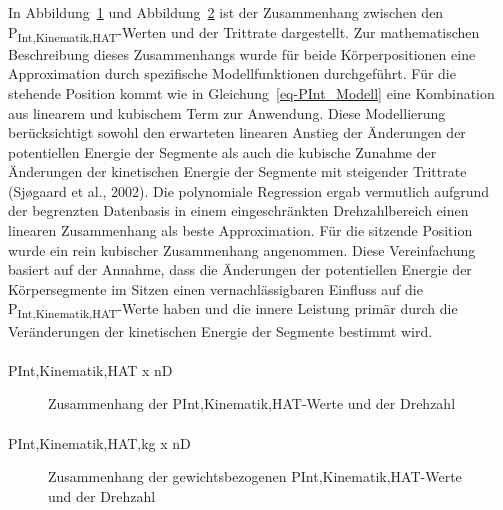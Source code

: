 \documentclass[
  letterpaper,
  DIV=11]{scrartcl}
\makeatletter
\let\oldparagraph\paragraph
\renewcommand{\paragraph}{
    \@ifstar
      \xxxParagraphStar
      \xxxParagraphNoStar
  }
\newcommand{\xxxParagraphStar}[1]{\oldparagraph*{#1}\mbox{}}
\newcommand{\xxxParagraphNoStar}[1]{\oldparagraph{#1}\mbox{}}
\makeatother
\begin{document}
In Abbildung~\ref{fig-PInt_Kinematik_HAT_Drehzahl} und
Abbildung~\ref{fig-PInt_Kinematik_HAT_Drehzahl_kg} ist der Zusammenhang
zwischen den P\textsubscript{Int,Kinematik,HAT}-Werten und der Trittrate
dargestellt. Zur mathematischen Beschreibung dieses Zusammenhangs wurde
für beide Körperpositionen eine Approximation durch spezifische
Modellfunktionen durchgeführt. Für die stehende Position kommt wie in
Gleichung~\ref{eq-PInt_Modell} eine Kombination aus linearem und
kubischem Term zur Anwendung. Diese Modellierung berücksichtigt sowohl
den erwarteten linearen Anstieg der Änderungen der potentiellen Energie
der Segmente als auch die kubische Zunahme der Änderungen der
kinetischen Energie der Segmente mit steigender Trittrate (Sjøgaard et
al., 2002). Die polynomiale Regression ergab vermutlich aufgrund der
begrenzten Datenbasis in einem eingeschränkten Drehzahlbereich einen
linearen Zusammenhang als beste Approximation. Für die sitzende Position
wurde ein rein kubischer Zusammenhang angenommen. Diese Vereinfachung
basiert auf der Annahme, dass die Änderungen der potentiellen Energie
der Körpersegmente im Sitzen einen vernachlässigbaren Einfluss auf die
P\textsubscript{Int,Kinematik,HAT}-Werte haben und die innere Leistung
primär durch die Veränderungen der kinetischen Energie der Segmente
bestimmt wird.

\paragraph{PInt,Kinematik,HAT x nD}

\begin{figure}


\caption{\label{fig-PInt_Kinematik_HAT_Drehzahl}Zusammenhang der
PInt,Kinematik,HAT-Werte und der Drehzahl}

\end{figure}%

\paragraph{PInt,Kinematik,HAT,kg x nD}

\begin{figure}


\caption{\label{fig-PInt_Kinematik_HAT_Drehzahl_kg}Zusammenhang der
gewichtsbezogenen PInt,Kinematik,HAT-Werte und der Drehzahl}

\end{figure}%
\end{document}
